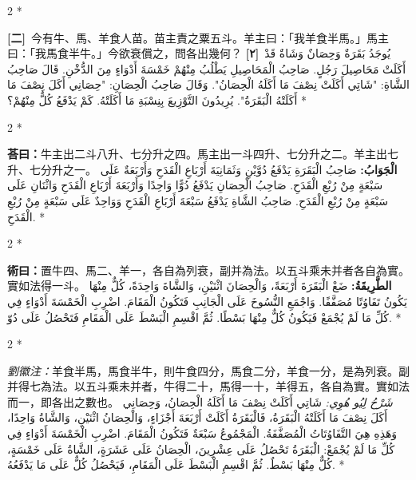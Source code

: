 \documentclass[11pt,a4paper]{article}
\newcommand{\ar}[1]{\arabicfont\beginR #1\endR}
\newcommand{\problemnum}[1]{\textbf{[\ignorespaces#1\unskip]}}
\newenvironment{bilingual}{%
  \begin{paracol}{2}%
  \switchcolumn[0]*%
}{%
  \end{paracol}%
}
\newcommand{\cnline}[1]{\switchcolumn[0]\noindent #1 \switchcolumn[1]}
\newcommand{\arline}[1]{\noindent\ar{#1} \switchcolumn[0]*}
\newenvironment{prob bilingual}{%
  \begin{paracol}{2}%
  \switchcolumn[0]*%
}{%
  \end{paracol}%
  \vspace{0.3em}%
}
\begin{document}
\begin{bilingual}
\cnline{\problemnum{二}\, 今有牛、馬、羊食人苗。苗主責之粟五斗。羊主曰：「我羊食半馬。」馬主曰：「我馬食半牛。」今欲衰償之，問各出幾何？}
\arline{\problemnum{٢}\, يُوجَدُ بَقَرَةٌ وَحِصَانٌ وَشَاةٌ قَدْ أَكَلَتْ مَحَاصِيلَ رَجُلٍ. صَاحِبُ الْمَحَاصِيلِ يَطْلُبُ مِنْهُمْ خَمْسَةَ أَدْوَاءٍ مِنَ الدُّخْنِ. قَالَ صَاحِبُ الشَّاةِ: "شَاتِي أَكَلَتْ نِصْفَ مَا أَكَلَهُ الْحِصَانُ". وَقَالَ صَاحِبُ الْحِصَانِ: "حِصَانِي أَكَلَ نِصْفَ مَا أَكَلَتْهُ الْبَقَرَةُ". يُرِيدُونَ التَّوْزِيعَ بِنِسْبَةِ مَا أَكَلَتْهُ. كَمْ يَدْفَعُ كُلٌّ مِنْهُمْ؟}
\end{bilingual}

\begin{bilingual}
\cnline{\textcolor{answercolor}{\textbf{荅曰：}}牛主出二斗八升、七分升之四。馬主出一斗四升、七分升之二。羊主出七升、七分升之一。}
\arline{\textcolor{answercolor}{\textbf{الْجَوَابُ:}} صَاحِبُ الْبَقَرَةِ يَدْفَعُ دُوَّيْنِ وَثَمَانِيَةَ أَرْبَاعِ الْقَدَحِ وَأَرْبَعَةٌ عَلَى سَبْعَةٍ مِنْ رُبْعِ الْقَدَحِ. صَاحِبُ الْحِصَانِ يَدْفَعُ دُوًّا وَاحِدًا وَأَرْبَعَةَ أَرْبَاعِ الْقَدَحِ وَاثْنَانِ عَلَى سَبْعَةٍ مِنْ رُبْعِ الْقَدَحِ. صَاحِبُ الشَّاةِ يَدْفَعُ سَبْعَةَ أَرْبَاعِ الْقَدَحِ وَوَاحِدٌ عَلَى سَبْعَةٍ مِنْ رُبْعِ الْقَدَحِ.}
\end{bilingual}

\begin{bilingual}
\cnline{%
\textcolor{methodcolor}{\textbf{術曰：}}置牛四、馬二、羊一，各自為列衰，副并為法。以五斗乘未并者各自為實。實如法得一斗。
}
\arline{%
\textcolor{methodcolor}{\textbf{الطَّرِيقَةُ:}} ضَعْ الْبَقَرَةَ أَرْبَعَةً، وَالْحِصَانَ اثْنَيْنِ، وَالشَّاةَ وَاحِدَةً، كُلٌّ مِنْهَا يَكُونُ تَفَاوُتًا مُصَفَّفًا. وَاجْمَعِ النُّسُوخَ عَلَى الْجَانِبِ فَتَكُونُ الْمَقَامَ. اضْرِبِ الْخَمْسَةَ أَدْوَاءٍ فِي كُلِّ مَا لَمْ يُجْمَعْ فَيَكُونُ كُلٌّ مِنْهَا بَسْطًا. ثُمَّ اقْسِمِ الْبَسْطَ عَلَى الْمَقَامِ فَتَحْصُلُ عَلَى دُوّ.
}
\end{bilingual}

\begin{bilingual}
\cnline{%
\textcolor{commentarycolor}{\small\textit{劉徽注：}}羊食半馬，馬食半牛，則牛食四分，馬食二分，羊食一分，是為列衰。副并得七為法。以五斗乘未并者，牛得二十，馬得一十，羊得五，各自為實。實如法而一，即各出之數也。
}
\arline{%
\textcolor{commentarycolor}{\small\textit{شَرْحُ لِيُو هُوِي:}} شَاتِي أَكَلَتْ نِصْفَ مَا أَكَلَهُ الْحِصَانُ، وَحِصَانِي أَكَلَ نِصْفَ مَا أَكَلَتْهُ الْبَقَرَةُ، فَالْبَقَرَةُ أَكَلَتْ أَرْبَعَةَ أَجْزَاءٍ، وَالْحِصَانُ اثْنَيْنِ، وَالشَّاةُ وَاحِدًا، وَهَذِهِ هِيَ التَّفَاوُتَاتُ الْمُصَفَّفَةُ. الْمَجْمُوعُ سَبْعَةٌ فَتَكُونُ الْمَقَامَ. اضْرِبِ الْخَمْسَةَ أَدْوَاءٍ فِي كُلِّ مَا لَمْ يُجْمَعْ: الْبَقَرَةُ تَحْصُلُ عَلَى عِشْرِينَ، الْحِصَانُ عَلَى عَشَرَةٍ، الشَّاةُ عَلَى خَمْسَةٍ، كُلٌّ مِنْهَا بَسْطٌ. ثُمَّ اقْسِمِ الْبَسْطَ عَلَى الْمَقَامِ، فَيَحْصُلُ كُلٌّ عَلَى مَا يَدْفَعُهُ.
}
\end{bilingual}
\end{document}
